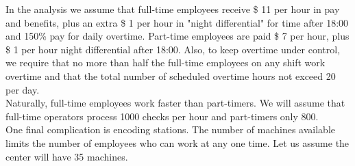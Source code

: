 \documentclass[a4paper,10 pt,titlepage,twoside]{book}
\theoremstyle{plain}
\theoremstyle{definition}
\theoremstyle{remark}
\begin{document}
In the analysis we assume that full-time employees receive \$ 11 per hour in pay and benefits, plus an extra \$ 1 per hour in "night differential" for time after 18:00 and 150\% pay for daily overtime. Part-time employees are paid \$ 7 per hour, plus \$ 1 per hour night differential after 18:00. Also, to keep overtime under control, we require that no more than half the full-time employees on any shift work overtime and that the total number of scheduled overtime hours not exceed 20 per day.\\
Naturally, full-time employees work faster than part-timers. We will assume that full-time operators process 1000 checks per hour and part-timers only 800.\\
One final complication is encoding stations. The number of machines available limits the number of employees who can work at any one time. Let us assume the center will have 35 machines.\\
\end{document}

